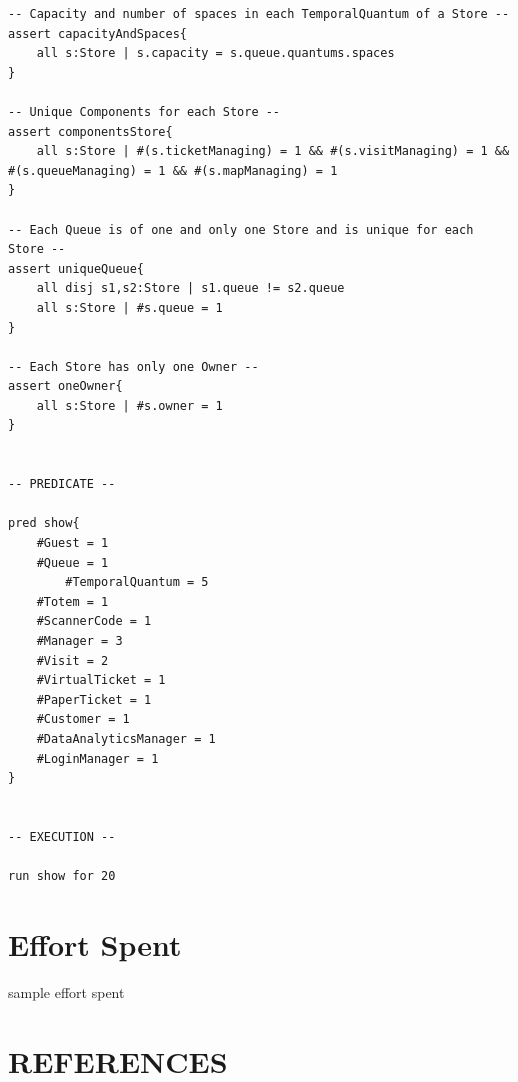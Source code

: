 \documentclass[a4paper, 10pt, oneside]{article}
\begin{document}
\begin{lstlisting}[language=alloy]
-- Capacity and number of spaces in each TemporalQuantum of a Store --
assert capacityAndSpaces{
	all s:Store | s.capacity = s.queue.quantums.spaces
}

-- Unique Components for each Store --
assert componentsStore{
	all s:Store | #(s.ticketManaging) = 1 && #(s.visitManaging) = 1 && #(s.queueManaging) = 1 && #(s.mapManaging) = 1
}

-- Each Queue is of one and only one Store and is unique for each Store --
assert uniqueQueue{
	all disj s1,s2:Store | s1.queue != s2.queue
	all s:Store | #s.queue = 1	
}

-- Each Store has only one Owner --
assert oneOwner{
	all s:Store | #s.owner = 1
}


-- PREDICATE --

pred show{
	#Guest = 1
	#Queue = 1
    	#TemporalQuantum = 5
	#Totem = 1
	#ScannerCode = 1
	#Manager = 3
	#Visit = 2
	#VirtualTicket = 1
	#PaperTicket = 1
	#Customer = 1
	#DataAnalyticsManager = 1
	#LoginManager = 1
}


-- EXECUTION --

run show for 20
\end{lstlisting}

\section{Effort Spent}
\label{effort}
sample effort spent

\section{REFERENCES}
\label{references}
\renewcommand{\refname}{}
\vspace{-2.6em}
\nocite{*}
 

\end{document}
